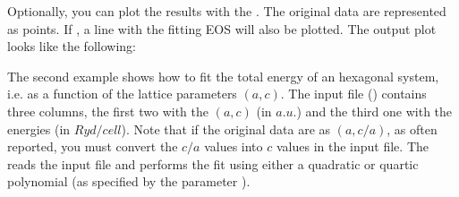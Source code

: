 \documentclass[letterpaper,10pt,english]{sphinxmanual}
\let\sphinxpxdimen\pdfpxdimen\else\newdimen\sphinxpxdimen
\begin{document}
\begin{sphinxVerbatim}[commandchars=\\\{\}]
  
\end{sphinxVerbatim}

Optionally, you can plot the results with the . The original data are represented as points. If , a line with the fitting EOS will also be plotted. The output plot looks like the following:

\noindent\sphinxincludegraphics[width=500\sphinxpxdimen]{{figure_1}.png}

The second example shows how to fit the total energy of an hexagonal system, i.e. as a function of the lattice parameters \((a,c)\). The input file () contains three columns, the first two with the \((a,c)\) (in \(a.u.\)) and the third one with the energies (in \(Ryd/cell\)). Note that if the original data are as \((a,c/a)\), as often reported, you must convert the \(c/a\) values into \(c\) values in the input file.
The  reads the input file and performs the fit using either a quadratic or quartic polynomial (as specified by the parameter ).
\end{document}
